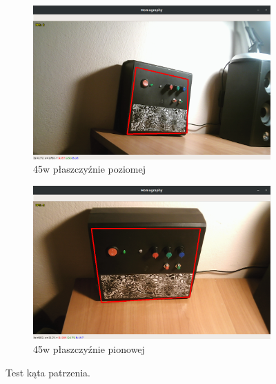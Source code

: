\documentclass[12pt,twoside,polish]{article}
\begin{document}
\begin{figure}[htb!]
	\begin{subfigure}{0.5\textwidth}
		\includegraphics[width=\textwidth]{test_angle1}
		\caption{45\degree w płaszczyźnie poziomej}
		\label{test_angl1}
	\end{subfigure}
	\begin{subfigure}{0.5\textwidth}
		\includegraphics[width=\textwidth]{test_angle2}
		\caption{45\degree w płaszczyźnie pionowej}
		\label{test_angl2}
	\end{subfigure}
	\caption{Test kąta patrzenia.}
\end{figure}
\FloatBarrier
\end{document}
